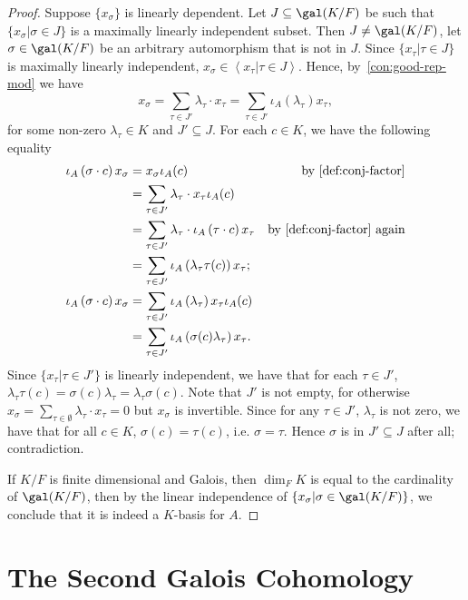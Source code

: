 \begin{proof}
  Suppose $\{x_{\sigma}\}$ is linearly dependent. Let $J \subseteq \gal(K/F)$ be such that $\{x_{\sigma}|\sigma\in J\}$ is a maximally linearly independent subset.
  Then $J \ne \gal(K/F)$, let $\sigma \in\gal(K/F)$ be an arbitrary automorphism that is not in $J$. Since $\{x_{\tau}|\tau\in J\}$ is maximally linearly independent, $x_\sigma \in \left\langle x_{\tau}|\tau\in J\right\rangle$. Hence, by~\cref{con:good-rep-mod} we have
  \[
    x_\sigma = \sum_{\tau\in J'}\lambda_{\tau}\cdot x_{\tau} = \sum_{\tau\in J'}\iota_{A}\left(\lambda_{\tau}\right)x_{\tau},
  \]
  for some non-zero $\lambda_{\tau}\in K$ and $J' \subseteq J$.
  For each $c \in K$, we have the following equality
  \[
    \begin{aligned}
      \iota_{A}\left(\sigma \cdot c\right) x_{\sigma}
      &= x_{\sigma} \iota_{A}(c) &\text{by~\cref{def:conj-factor}}\\
      &= \sum_{\tau\in J'}\lambda_{\tau}\cdot x_{\tau}\iota_{A}(c) & \\
      &= \sum_{\tau\in J'}\lambda_{\tau}\cdot \iota_{A}\left(\tau\cdot c\right)x_{\tau} &\text{by~\cref{def:conj-factor} again}\\
      &=\sum_{\tau\in J'}\iota_{A}\left(\lambda_{\tau}\tau(c)\right)x_{\tau};\\
      \iota_{A}\left(\sigma\cdot c\right)x_{\sigma}
      &= \sum_{\tau\in J'}\iota_{A}\left(\lambda_{\tau}\right) x_{\tau}\iota_{A}(c)\\
      &= \sum_{\tau\in J'}\iota_{A}\left(\sigma(c)\lambda_{\tau}\right)x_{\tau}.
    \end{aligned}
  \]
  Since $\{x_{\tau}|\tau\in J'\}$ is linearly independent, we have that for each $\tau \in J'$, $\lambda_{\tau}\tau(c) = \sigma(c)\lambda_{\tau} = \lambda_{\tau}\sigma(c)$. Note that $J'$ is not empty, for otherwise $x_{\sigma}=\sum_{\tau\in\emptyset}\lambda_{\tau}\cdot x_{\tau}=0$ but $x_{\sigma}$ is invertible. Since for any $\tau\in J'$, $\lambda_{\tau}$ is not zero, we have that for all $c \in K$, $\sigma(c) = \tau(c)$, i.e. $\sigma = \tau$. Hence $\sigma$ is in $J' \subseteq J$ after all; contradiction.

  If $K/F$ is finite dimensional and Galois, then $\dim_{F}K$ is equal to the cardinality of $\gal(K/F)$, then by the linear independence of $\{x_{\sigma}|\sigma\in\gal(K/F)\}$, we conclude that it is indeed a $K$-basis for $A$.
\end{proof}

\section{The Second Galois Cohomology}

